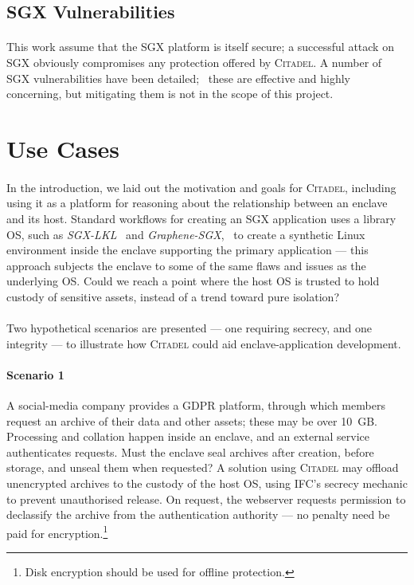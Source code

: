 \subsection{SGX Vulnerabilities}
\label{sec:sgx-vulnerabilities}
\paragraph{} This work assume that the SGX platform is itself secure; a successful attack on SGX obviously compromises any protection offered by \textsc{Citadel}. A number of SGX vulnerabilities have been detailed;~\cite{lipp2018meltdown, vanbulck2018foreshadow, Schwarz2019ZombieLoad, ridl, vanbulck2020lvi} these are effective and highly concerning, but mitigating them is not in the scope of this project.

\section{Use Cases}

\paragraph{} In the introduction, we laid out the motivation and goals for \textsc{Citadel}, including using it as a platform for reasoning about the relationship between an enclave and its host. Standard workflows for creating an SGX application uses a library OS, such as \textit{SGX-LKL}~\cite{priebe2019sgxlkl} and \textit{Graphene-SGX},~\cite{203255} to create a synthetic Linux environment inside the enclave supporting the primary application --- this approach subjects the enclave to some of the same flaws and issues as the underlying OS. Could we reach a point where the host OS is trusted to hold custody of sensitive assets, instead of a trend toward pure isolation?

\paragraph{} Two hypothetical scenarios are presented --- one requiring secrecy, and one integrity --- to illustrate how \textsc{Citadel} could aid enclave-application development.

\paragraph{Scenario 1} A social-media company provides a GDPR platform, through which members request an archive of their data and other assets; these may be over 10~GB. Processing and collation happen inside an enclave, and an external service authenticates requests. Must the enclave seal archives after creation, before storage, and unseal them when requested? A solution using \textsc{Citadel} may offload unencrypted archives to the custody of the host OS, using IFC's secrecy mechanic to prevent unauthorised release. On request, the webserver requests permission to declassify the archive from the authentication authority --- no penalty need be paid for encryption.\footnote{Disk encryption should be used for offline protection.}


